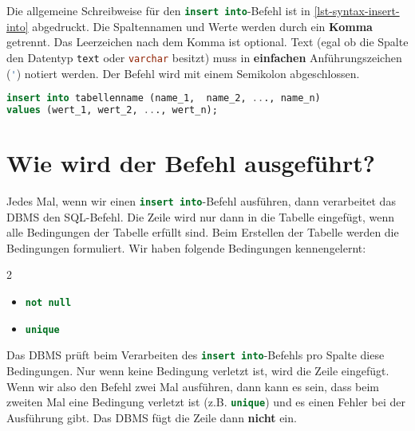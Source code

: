 Die allgemeine Schreibweise für den \lstinline[language=sql]{insert into}-Befehl ist in \autoref{lst-syntax-insert-into} abgedruckt. Die Spaltennamen und Werte werden durch ein \textbf{Komma} getrennt. Das Leerzeichen nach dem Komma ist optional. Text (egal ob die Spalte den Datentyp \lstinline[language=SQL, morekeywords={real, text}]{text} oder \lstinline[language=SQL, morekeywords={real, text}]{varchar} besitzt) muss in \textbf{einfachen} Anführungszeichen (\lstinline[language=SQL, upquote=true]{'}) notiert werden. Der Befehl wird mit einem Semikolon abgeschlossen.

\begin{lstlisting}[language=SQL, morekeywords={real, text}, caption={Die Reihenfolge der Spaltennamen und Werte spielt eine Rolle. Der erste Wert wird in die erste Spalte eingefügt. Der zweite Wert in die zweite Spalte usw.}, label={lst-syntax-insert-into}]
insert into tabellenname (name_1,  name_2, ..., name_n)
values (wert_1, wert_2, ..., wert_n);
\end{lstlisting}

\section{Wie wird der Befehl ausgeführt?}

Jedes Mal, wenn wir einen \lstinline[language=sql]{insert into}-Befehl ausführen, dann verarbeitet das \ac{DBMS} den \ac{SQL}-Befehl. Die Zeile wird nur dann in die Tabelle eingefügt, wenn alle Bedingungen der Tabelle erfüllt sind. Beim Erstellen der Tabelle werden die Bedingungen formuliert. Wir haben folgende Bedingungen kennengelernt:

\begin{multicols}{2}
\begin{itemize}
\item \lstinline[language=sql]{not null}
\item \lstinline[language=sql]{unique}
\end{itemize}
\end{multicols}

Das \ac{DBMS} prüft beim Verarbeiten des \lstinline[language=sql]{insert into}-Befehls pro Spalte diese Bedingungen. Nur wenn keine Bedingung verletzt ist, wird die Zeile eingefügt. Wenn wir also den Befehl zwei Mal ausführen, dann kann es sein, dass beim zweiten Mal eine Bedingung verletzt ist (z.B. \lstinline[language=sql]{unique}) und es einen Fehler bei der Ausführung gibt. Das \ac{DBMS} fügt die Zeile dann \textbf{nicht} ein.

